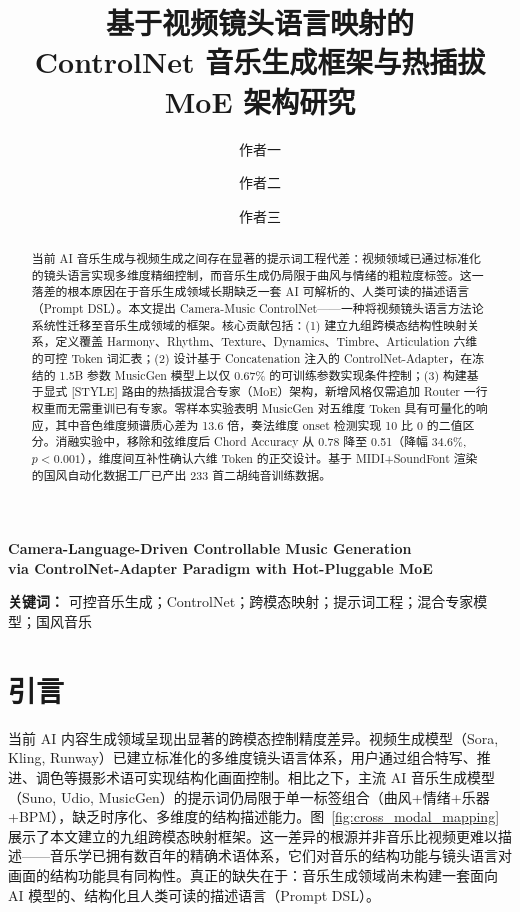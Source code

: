 \documentclass[11pt]{article}
\title{\vspace{-1.5cm}\bfseries 基于视频镜头语言映射的\\ControlNet 音乐生成框架与热插拔 MoE 架构研究}
\author[1]{作者一}
\author[1]{作者二}
\author[2]{作者三}
\affil[1]{XX大学 · 计算机学院}
\affil[2]{XX大学 · 人工智能研究院}
\date{}
\begin{document}
\maketitle

\begin{center}
\textbf{Camera-Language-Driven Controllable Music Generation\\via ControlNet-Adapter Paradigm with Hot-Pluggable MoE}
\end{center}

\begin{abstract}
当前 AI 音乐生成与视频生成之间存在显著的提示词工程代差：视频领域已通过标准化的镜头语言实现多维度精细控制，而音乐生成仍局限于曲风与情绪的粗粒度标签。这一落差的根本原因在于音乐生成领域长期缺乏一套 AI 可解析的、人类可读的描述语言（Prompt DSL）。本文提出 Camera-Music ControlNet——一种将视频镜头语言方法论系统性迁移至音乐生成领域的框架。核心贡献包括：(1) 建立九组跨模态结构性映射关系，定义覆盖 Harmony、Rhythm、Texture、Dynamics、Timbre、Articulation 六维的可控 Token 词汇表；(2) 设计基于 Concatenation 注入的 ControlNet-Adapter，在冻结的 1.5B 参数 MusicGen 模型上以仅 0.67\% 的可训练参数实现条件控制；(3) 构建基于显式 [STYLE] 路由的热插拔混合专家（MoE）架构，新增风格仅需追加 Router 一行权重而无需重训已有专家。零样本实验表明 MusicGen 对五维度 Token 具有可量化的响应，其中音色维度频谱质心差为 13.6 倍，奏法维度 onset 检测实现 10 比 0 的二值区分。消融实验中，移除和弦维度后 Chord Accuracy 从 0.78 降至 0.51（降幅 34.6\%, $p<0.001$），维度间互补性确认六维 Token 的正交设计。基于 MIDI+SoundFont 渲染的国风自动化数据工厂已产出 233 首二胡纯音训练数据。
\end{abstract}

\vspace{4pt}
\noindent\textbf{关键词：} 可控音乐生成；ControlNet；跨模态映射；提示词工程；混合专家模型；国风音乐

\section{引言}

当前 AI 内容生成领域呈现出显著的跨模态控制精度差异。视频生成模型（Sora, Kling, Runway）已建立标准化的多维度镜头语言体系，用户通过组合特写、推进、调色等摄影术语可实现结构化画面控制。相比之下，主流 AI 音乐生成模型（Suno, Udio, MusicGen）的提示词仍局限于单一标签组合（曲风+情绪+乐器+BPM），缺乏时序化、多维度的结构描述能力。图~\ref{fig:cross_modal_mapping} 展示了本文建立的九组跨模态映射框架。这一差异的根源并非音乐比视频更难以描述——音乐学已拥有数百年的精确术语体系，它们对音乐的结构功能与镜头语言对画面的结构功能具有同构性。真正的缺失在于：音乐生成领域尚未构建一套面向 AI 模型的、结构化且人类可读的描述语言（Prompt DSL）。
\end{document}

